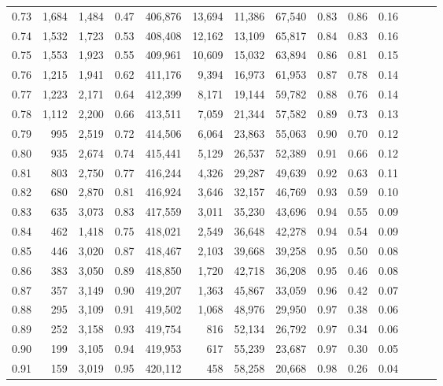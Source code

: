\begin{tabular}{rrrrrrrrrrrrrr}
0.73 &  1,684 &  1,484 &  0.47 &  406,876 &   13,694 &  11,386 &  67,540 &  0.83 &  0.86 &      0.16 \\
0.74 &  1,532 &  1,723 &  0.53 &  408,408 &   12,162 &  13,109 &  65,817 &  0.84 &  0.83 &      0.16 \\
0.75 &  1,553 &  1,923 &  0.55 &  409,961 &   10,609 &  15,032 &  63,894 &  0.86 &  0.81 &      0.15 \\
0.76 &  1,215 &  1,941 &  0.62 &  411,176 &    9,394 &  16,973 &  61,953 &  0.87 &  0.78 &      0.14 \\
0.77 &  1,223 &  2,171 &  0.64 &  412,399 &    8,171 &  19,144 &  59,782 &  0.88 &  0.76 &      0.14 \\
0.78 &  1,112 &  2,200 &  0.66 &  413,511 &    7,059 &  21,344 &  57,582 &  0.89 &  0.73 &      0.13 \\
0.79 &    995 &  2,519 &  0.72 &  414,506 &    6,064 &  23,863 &  55,063 &  0.90 &  0.70 &      0.12 \\
0.80 &    935 &  2,674 &  0.74 &  415,441 &    5,129 &  26,537 &  52,389 &  0.91 &  0.66 &      0.12 \\
0.81 &    803 &  2,750 &  0.77 &  416,244 &    4,326 &  29,287 &  49,639 &  0.92 &  0.63 &      0.11 \\
0.82 &    680 &  2,870 &  0.81 &  416,924 &    3,646 &  32,157 &  46,769 &  0.93 &  0.59 &      0.10 \\
0.83 &    635 &  3,073 &  0.83 &  417,559 &    3,011 &  35,230 &  43,696 &  0.94 &  0.55 &      0.09 \\
0.84 &    462 &  1,418 &  0.75 &  418,021 &    2,549 &  36,648 &  42,278 &  0.94 &  0.54 &      0.09 \\
0.85 &    446 &  3,020 &  0.87 &  418,467 &    2,103 &  39,668 &  39,258 &  0.95 &  0.50 &      0.08 \\
0.86 &    383 &  3,050 &  0.89 &  418,850 &    1,720 &  42,718 &  36,208 &  0.95 &  0.46 &      0.08 \\
0.87 &    357 &  3,149 &  0.90 &  419,207 &    1,363 &  45,867 &  33,059 &  0.96 &  0.42 &      0.07 \\
0.88 &    295 &  3,109 &  0.91 &  419,502 &    1,068 &  48,976 &  29,950 &  0.97 &  0.38 &      0.06 \\
0.89 &    252 &  3,158 &  0.93 &  419,754 &      816 &  52,134 &  26,792 &  0.97 &  0.34 &      0.06 \\
0.90 &    199 &  3,105 &  0.94 &  419,953 &      617 &  55,239 &  23,687 &  0.97 &  0.30 &      0.05 \\
0.91 &    159 &  3,019 &  0.95 &  420,112 &      458 &  58,258 &  20,668 &  0.98 &  0.26 &      0.04 \\

\end{tabular}
